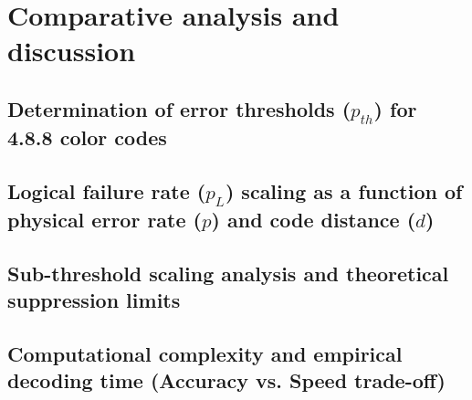 \chapter{Comparative analysis and discussion}
\label{chap:comparative_analysis}


\section{Determination of error thresholds ($p_{th}$) for 4.8.8 color codes}

\section{Logical failure rate ($p_L$) scaling as a function of physical error rate ($p$) and code distance ($d$)}

\section{Sub-threshold scaling analysis and theoretical suppression limits}

\section{Computational complexity and empirical decoding time (Accuracy vs. Speed trade-off)}
